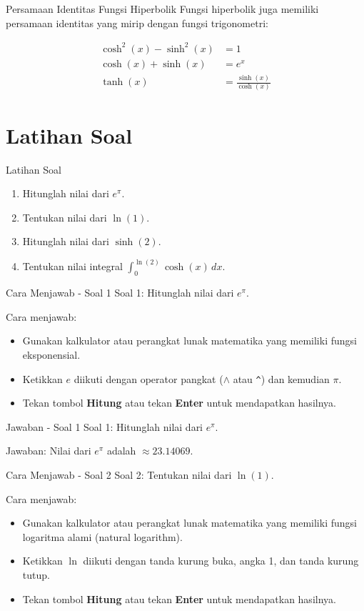 \documentclass{beamer}
\begin{document}
\begin{frame}{Persamaan Identitas Fungsi Hiperbolik}
  Fungsi hiperbolik juga memiliki persamaan identitas yang mirip dengan fungsi trigonometri:

  \begin{align*}
    \cosh^2(x) - \sinh^2(x) &= 1 \\
    \cosh(x) + \sinh(x) &= e^x \\
    \tanh(x) &= \frac{\sinh(x)}{\cosh(x)}
  \end{align*}
\end{frame}

\section{Latihan Soal}

\begin{frame}{Latihan Soal}
  \begin{enumerate}
    \item Hitunglah nilai dari $e^{\pi}$.
    \item Tentukan nilai dari $\ln(1)$.
    \item Hitunglah nilai dari $\sinh(2)$.
    \item Tentukan nilai integral $\int_{0}^{\ln(2)} \cosh(x) \, dx$.
  \end{enumerate}
\end{frame}

\begin{frame}{Cara Menjawab - Soal 1}
  Soal 1: Hitunglah nilai dari $e^{\pi}$.

  Cara menjawab:
  \begin{itemize}
    \item Gunakan kalkulator atau perangkat lunak matematika yang memiliki fungsi eksponensial.
    \item Ketikkan $e$ diikuti dengan operator pangkat ($\wedge$ atau \texttt{^}) dan kemudian $\pi$.
    \item Tekan tombol \textbf{Hitung} atau tekan \textbf{Enter} untuk mendapatkan hasilnya.
  \end{itemize}
\end{frame}

\begin{frame}{Jawaban - Soal 1}
  Soal 1: Hitunglah nilai dari $e^{\pi}$.

  Jawaban: Nilai dari $e^{\pi}$ adalah $\approx 23.14069$.
\end{frame}

\begin{frame}{Cara Menjawab - Soal 2}
  Soal 2: Tentukan nilai dari $\ln(1)$.

  Cara menjawab:
  \begin{itemize}
    \item Gunakan kalkulator atau perangkat lunak matematika yang memiliki fungsi logaritma alami (natural logarithm).
    \item Ketikkan $\ln$ diikuti dengan tanda kurung buka, angka 1, dan tanda kurung tutup.
    \item Tekan tombol \textbf{Hitung} atau tekan \textbf{Enter} untuk mendapatkan hasilnya.
  \end{itemize}
\end{frame}
\end{document}

